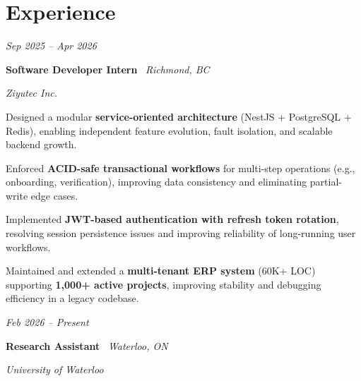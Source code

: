 \section{Experience}

    \begin{twocolentry}{

    \textit{Sep 2025 -- Apr 2026}}
        \textbf{Software Developer Intern} \textbar\ \textit{Richmond, BC}
        
        \textit{Ziyutec Inc.}
    \end{twocolentry}

    \vspace{0.10 cm}
    \begin{onecolentry}
        \begin{highlights}
    
    \item Designed a modular \textbf{service-oriented architecture} (NestJS + PostgreSQL + Redis), enabling independent feature evolution, fault isolation, and scalable backend growth.

    \item Enforced \textbf{ACID-safe transactional workflows} for multi-step operations (e.g., onboarding, verification), improving data consistency and eliminating partial-write edge cases.

    \item Implemented \textbf{JWT-based authentication with refresh token rotation}, resolving session persistence issues and improving reliability of long-running user workflows.

    \item Maintained and extended a \textbf{multi-tenant ERP system} (60K+ LOC) supporting \textbf{1,000+ active projects}, improving stability and debugging efficiency in a legacy codebase.

        
        \end{highlights}
    \end{onecolentry}
\vspace{0.2cm}    \begin{twocolentry}{

    \textit{Feb 2026 -- Present}}
        \textbf{Research Assistant} \textbar\ \textit{Waterloo, ON}
        
        \textit{University of Waterloo}
    \end{twocolentry}

